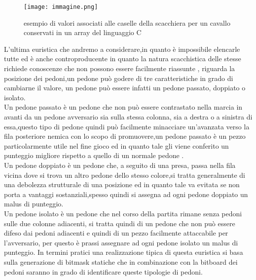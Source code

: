 \begin{figure}
    \centering
    \texttt{[image: immagine.png]}
    \caption{esempio di valori associati alle caselle della scacchiera per un cavallo conservati in un array del linguaggio C}
\end{figure}

L'ultima euristica che andremo a considerare,in quanto è impossibile elencarle tutte ed è anche controproducente in quanto la natura scacchistica delle stesse richiede conoscenze che non possono essere facilmente riassunte
, riguarda la posizione dei pedoni,un pedone può godere di tre caratteristiche in grado di cambiarne il valore, un pedone può essere infatti  un pedone passato, doppiato o isolato.\\
Un pedone passato è un pedone che non può essere contrastato nella marcia in avanti da un pedone avversario sia sulla stessa colonna, sia a destra o a sinistra di essa,questo tipo di pedone quindi può facilmente 
minacciare un'avanzata verso la fila posteriore nemica con lo scopo di promuovere,un pedone passato è un pezzo particolarmente utile nel fine gioco ed in quanto tale gli viene conferito un punteggio migliore
rispetto a quello di un normale pedone .\\ 
Un pedone doppiato è un pedone che, a seguito di una presa, passa nella fila vicina dove si trova un altro pedone dello stesso colore,si tratta generalmente di una debolezza strutturale di una posizione 
ed in quanto tale va evitata se non porta a vantaggi sostanziali,spesso quindi si assegna ad ogni pedone doppiato un malus di punteggio.\\
Un pedone isolato è un pedone che nel corso della partita rimane senza pedoni sulle due colonne adiacenti, si tratta quindi di un pedone che non può essere difeso dai pedoni adiacenti e quindi di un pezzo
facilmente attaccabile per l'avversario, per questo è prassi assegnare ad ogni pedone isolato un malus di punteggio.
In termini pratici una realizzazione tipica di questa euristica si basa sulla generazione di bitmask statiche che in combinazione con la bitboard dei pedoni saranno in grado di identificare queste tipologie di pedoni.



